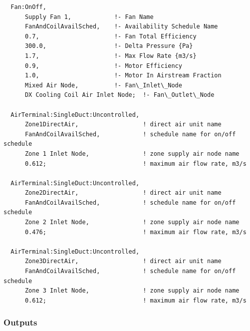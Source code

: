 \begin{lstlisting}
  Fan:OnOff,
      Supply Fan 1,            !- Fan Name
      FanAndCoilAvailSched,    !- Availability Schedule Name
      0.7,                     !- Fan Total Efficiency
      300.0,                   !- Delta Pressure {Pa}
      1.7,                     !- Max Flow Rate {m3/s}
      0.9,                     !- Motor Efficiency
      1.0,                     !- Motor In Airstream Fraction
      Mixed Air Node,          !- Fan\_Inlet\_Node
      DX Cooling Coil Air Inlet Node;  !- Fan\_Outlet\_Node

  AirTerminal:SingleDuct:Uncontrolled,
      Zone1DirectAir,                  ! direct air unit name
      FanAndCoilAvailSched,            ! schedule name for on/off schedule
      Zone 1 Inlet Node,               ! zone supply air node name
      0.612;                           ! maximum air flow rate, m3/s

  AirTerminal:SingleDuct:Uncontrolled,
      Zone2DirectAir,                  ! direct air unit name
      FanAndCoilAvailSched,            ! schedule name for on/off schedule
      Zone 2 Inlet Node,               ! zone supply air node name
      0.476;                           ! maximum air flow rate, m3/s

  AirTerminal:SingleDuct:Uncontrolled,
      Zone3DirectAir,                  ! direct air unit name
      FanAndCoilAvailSched,            ! schedule name for on/off schedule
      Zone 3 Inlet Node,               ! zone supply air node name
      0.612;                           ! maximum air flow rate, m3/s
\end{lstlisting}

\subsubsection{Outputs}\label{outputs-3-021}

